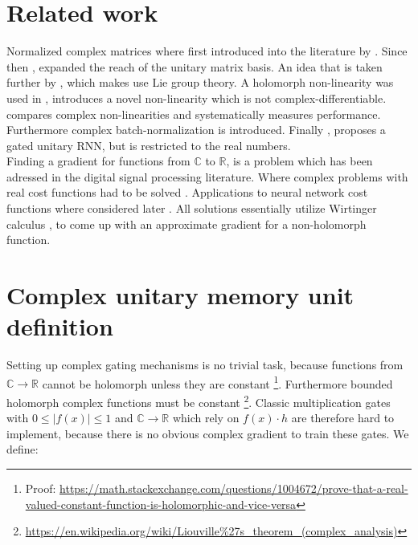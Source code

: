 \documentclass{article}
\begin{document}
\section{Related work}
Normalized complex matrices where first introduced into the literature by \cite{Arjovsky}. Since then \cite{Wisdom}, expanded the reach of the unitary matrix basis. An idea that is taken further by \cite{Hyland}, which makes use Lie group theory.  
A holomorph non-linearity was used in \cite{Guberman}, \cite{Arjovsky} introduces a novel non-linearity which is not complex-differentiable. \cite{Trabelsi} compares complex non-linearities and systematically measures performance. Furthermore complex batch-normalization is introduced.
Finally \cite{Jing}, proposes a gated unitary RNN, but is restricted to the real numbers. \\
Finding a gradient for functions from $\mathbb{C}$ to $\mathbb{R}$, is a problem which has been adressed in the digital signal processing literature. Where complex problems with real cost functions had to be solved \cite{Brandwood}\cite{Bos}\cite{Franken}\cite{Delgado}. Applications to neural network cost functions where considered later \cite{Mandic}. All solutions essentially utilize Wirtinger calculus \cite{Wirtinger}, to come up with an approximate gradient for a non-holomorph function.

\section{Complex unitary memory unit definition}
Setting up complex gating mechanisms is no trivial task, because functions from $\mathbb{C} \rightarrow \mathbb{R}$ cannot be holomorph unless they are constant \cite[page 9]{Bornemann}\footnote{Proof: \url{https://math.stackexchange.com/questions/1004672/prove-that-a-real-valued-constant-function-is-holomorphic-and-vice-versa}}. Furthermore bounded holomorph complex functions must be constant \cite[page 38]{Bornemann}\footnote{\url{https://en.wikipedia.org/wiki/Liouville\%27s\_theorem\_(complex\_analysis)}}.
Classic multiplication gates with $0 \leq |f(x)| \leq 1$ and $\mathbb{C} \rightarrow \mathbb{R}$ which rely on $f(x) \cdot h$ are therefore hard to implement, because there is no obvious complex gradient to train these gates. 
We define:
\end{document}
